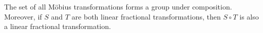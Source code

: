 The set of all Möbius transformations forms a group under composition. Moreover, if $S$ and $T$ are both linear fractional transformations, then $S \circ T$ is also a linear fractional transformation.
